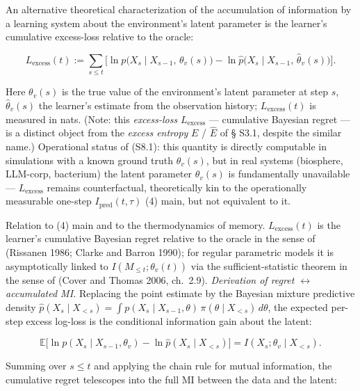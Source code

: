 \documentclass[pdflatex,sn-mathphys-ay]{sn-jnl}
\providecommand{\lt}{<}\providecommand{\gt}{>}
\begin{document}
An alternative theoretical characterization of the accumulation of information by a learning system about the environment's latent parameter is the learner's cumulative excess-loss relative to the oracle:



\begin{equation}L_{\text{excess}}(t) := \sum_{s \le t} \bigl[ \ln p\bigl(X_s \mid X_{s-1},\, \theta_v(s)\bigr) - \ln \hat p\bigl(X_s \mid X_{s-1},\, \hat\theta_v(s)\bigr) \bigr]. \tag{S8.1}\end{equation}



Here \(\theta_v(s)\) is the true value of the environment's latent parameter at step \(s\), \(\hat\theta_v(s)\) the learner's estimate from the observation history; \(L_{\text{excess}}(t)\) is measured in nats. (Note: this \emph{excess-loss} \(L_{\text{excess}}\) --- cumulative Bayesian regret --- is a distinct object from the \emph{excess entropy} \(E\) / \(\hat E\) of § S3.1, despite the similar name.) Operational status of (S8.1): this quantity is directly computable in simulations with a known ground truth \(\theta_v(s)\), but in real systems (biosphere, LLM-corp, bacterium) the latent parameter \(\theta_v(s)\) is fundamentally unavailable --- \(L_{\text{excess}}\) remains counterfactual, theoretically kin to the operationally measurable one-step \(I_{\text{pred}}(t,\tau)\) (4) main, but not equivalent to it.



Relation to (4) main and to the thermodynamics of memory. \(L_{\text{excess}}(t)\) is the learner's cumulative Bayesian regret relative to the oracle in the sense of (Rissanen 1986; Clarke and Barron 1990); for regular parametric models it is asymptotically linked to \(I(M_{\le t}; \theta_v(t))\) via the sufficient-statistic theorem in the sense of (Cover and Thomas 2006, ch.~2.9). \emph{Derivation of regret \(\leftrightarrow\) accumulated MI.} Replacing the point estimate by the Bayesian mixture predictive density \(\hat p(X_s\mid X_{\lt s}) = \int p(X_s\mid X_{s-1},\theta)\, \pi(\theta\mid X_{\lt s})\,d\theta\), the expected per-step excess log-loss is the conditional information gain about the latent:



\[\mathbb{E}\bigl[\ln p(X_s\mid X_{s-1},\theta_v) - \ln \hat p(X_s\mid X_{\lt s})\bigr] = I(X_s;\theta_v\mid X_{\lt s}).\]



Summing over \(s \le t\) and applying the chain rule for mutual information, the cumulative regret telescopes into the full MI between the data and the latent:
\end{document}
